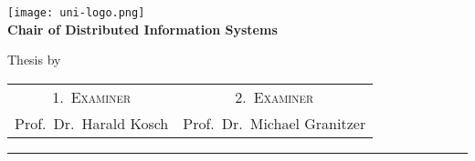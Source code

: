 \begin{titlepage}
    \centering
    \begin{onehalfspace}
        	\texttt{[image: uni-logo.png]}\\
        	\vspace{1.0cm}
        	\large {\bfseries Chair of Distributed Information Systems } \\

        	\vspace{2.5cm}

            \begin{doublespace}
            	\textenglish{\textsf{\Huge{\thetitle}}}
            \end{doublespace}

        	\vspace{2cm}

            \Large{Thesis by}\\

        	\vspace{1cm}

        	{\bfseries \large{\theauthor}}

        	\vfill

        	{\large
        		\begin{tabular}[l]{cc}
        			\textsc{1.~Examiner} & \textsc{2.~Examiner} \\
        			Prof.~Dr.~Harald Kosch & Prof.~Dr.~Michael Granitzer
        		\end{tabular}
        	}

        	\vspace{1.5cm}

        	\parbox{\linewidth}{\hrule\strut}

            \vfill

	    \thedate
    \end{onehalfspace}
\end{titlepage}
